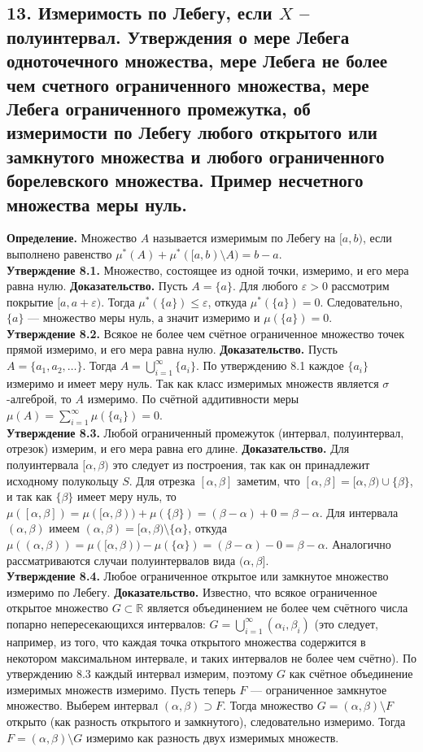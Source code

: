 \documentclass[12pt]{article}
\begin{document}
\subsection*{13. Измеримость по Лебегу, если $X$ – полуинтервал. Утверждения о мере Лебега
одноточечного множества, мере Лебега не более чем счетного ограниченного
множества, мере Лебега ограниченного промежутка, об измеримости по Лебегу
любого открытого или замкнутого множества и любого ограниченного борелевского
множества. Пример несчетного множества меры нуль.}
\textbf{Определение.} Множество $A$ называется измеримым по Лебегу на $[a,b)$, если выполнено равенство $\mu^{*}(A)+\mu^{*}([a,b)\setminus A)=b-a$. \\\textbf{Утверждение 8.1.} Множество, состоящее из одной точки, измеримо, и его мера равна нулю. \textbf{Доказательство.} Пусть $A=\{a\}$. Для любого $\varepsilon>0$ рассмотрим покрытие $[a,a+\varepsilon)$. Тогда $\mu^{*}(\{a\})\le\varepsilon$, откуда $\mu^{*}(\{a\})=0$. Следовательно, $\{a\}$ — множество меры нуль, а значит измеримо и $\mu(\{a\})=0$. \\\textbf{Утверждение 8.2.} Всякое не более чем счётное ограниченное множество точек прямой измеримо, и его мера равна нулю. \textbf{Доказательство.} Пусть $A=\{a_1,a_2,\dots\}$. Тогда $A=\bigcup_{i=1}^{\infty}\{a_i\}$. По утверждению 8.1 каждое $\{a_i\}$ измеримо и имеет меру нуль. Так как класс измеримых множеств является $\sigma$-алгеброй, то $A$ измеримо. По счётной аддитивности меры $\mu(A)=\sum_{i=1}^{\infty}\mu(\{a_i\})=0$. \\\textbf{Утверждение 8.3.} Любой ограниченный промежуток (интервал, полуинтервал, отрезок) измерим, и его мера равна его длине. \textbf{Доказательство.} Для полуинтервала $[\alpha,\beta)$ это следует из построения, так как он принадлежит исходному полукольцу $S$. Для отрезка $[\alpha,\beta]$ заметим, что $[\alpha,\beta]=[\alpha,\beta)\cup\{\beta\}$, и так как $\{\beta\}$ имеет меру нуль, то $\mu([\alpha,\beta])=\mu([\alpha,\beta))+\mu(\{\beta\})=(\beta-\alpha)+0=\beta-\alpha$. Для интервала $(\alpha,\beta)$ имеем $(\alpha,\beta)=[\alpha,\beta)\setminus\{\alpha\}$, откуда $\mu((\alpha,\beta))=\mu([\alpha,\beta))-\mu(\{\alpha\})=(\beta-\alpha)-0=\beta-\alpha$. Аналогично рассматриваются случаи полуинтервалов вида $(\alpha,\beta]$. \\\textbf{Утверждение 8.4.} Любое ограниченное открытое или замкнутое множество измеримо по Лебегу. \textbf{Доказательство.} Известно, что всякое ограниченное открытое множество $G\subset\mathbb{R}$ является объединением не более чем счётного числа попарно непересекающихся интервалов: $G=\bigcup_{i=1}^{\infty}(\alpha_i,\beta_i)$ (это следует, например, из того, что каждая точка открытого множества содержится в некотором максимальном интервале, и таких интервалов не более чем счётно). По утверждению 8.3 каждый интервал измерим, поэтому $G$ как счётное объединение измеримых множеств измеримо. Пусть теперь $F$ — ограниченное замкнутое множество. Выберем интервал $(\alpha,\beta)\supset F$. Тогда множество $G=(\alpha,\beta)\setminus F$ открыто (как разность открытого и замкнутого), следовательно измеримо. Тогда $F=(\alpha,\beta)\setminus G$ измеримо как разность двух измеримых множеств.
\end{document}
